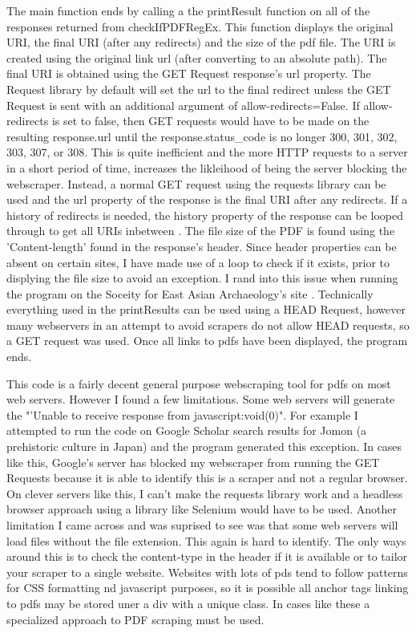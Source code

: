 \documentclass[12pt]{article}
\begin{document}
The main function ends by calling a the printResult function on all of the responses returned from checkIfPDFRegEx. This function displays the original URI, the final URI (after any redirects) and the size of the pdf file. The URI is created using the original link url (after converting to an absolute path). The final URI is obtained using the GET Request response's url property. The Request library by default will set the url to the final redirect unless the GET Request is sent with an additional argument of allow-redirects=False. If allow-redirects is set to false, then GET requests would have to be made on the resulting response.url until the response.status\_code is no longer 300, 301, 302, 303, 307, or 308. This is quite inefficient and the more HTTP requests to a server in a short period of time, increases the likleihood of being the server blocking the webscraper. Instead, a normal GET request using the requests library can be used and the url property of the response is the final URI after any redirects. If a history of redirects is needed, the history property of the response can be looped through to get all URIs inbetween \cite{stackOverflowRedirects}. The file size of the PDF is found using the 'Content-length'  found in the response's header.  Since header properties can be absent on certain sites, I have made use of a loop to check if it exists, prior to displying the file size to avoid an exception. I rand into this issue when running the program on the Soceity for East Asian Archaeology's site  \cite{bulletin2016SEAA}. Technically everything used in the printResults  can be used using a HEAD Request, however many webservers in an attempt to avoid scrapers do not allow HEAD requests, so a GET request was used. Once all links to pdfs have been displayed, the program ends. 

This code is a fairly decent general purpose webscraping tool for pdfs on most web servers. However I found a few limitations. Some web servers will generate the "'Unable to receive response from  javascript:void(0)". For example I attempted to run the code on Google Scholar search results for Jomon (a prehistoric culture in Japan) \cite{googleScholarJomon} and the program generated this exception. In cases like this, Google's server has blocked my webscraper from running the GET Requests because it is able to identify this is a scraper and not a regular browser. On clever servers like this, I can't make the requests library work and a headless browser approach using a library like Selenium would have to be used. Another limitation I came across and was suprised to see was that some web servers will load files without the file extension. This again is hard to identify. The only ways around this is to check the content-type in the header if it is available or to tailor your scraper to a single website. Websites with lots of pds tend to follow patterns for CSS formatting nd javascript purposes, so it is possible all anchor tags linking to pdfs may be stored uner a div with a unique class. In cases like these a specialized approach to PDF scraping must be used. 



\end{document}
